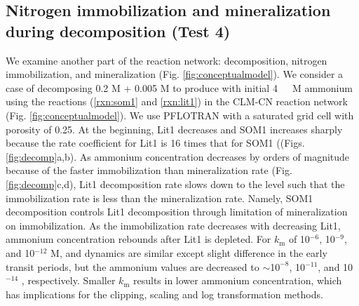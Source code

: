 \documentclass[gmd, manuscript]{copernicus}
\begin{document}
\subsection{Nitrogen immobilization and mineralization during decomposition (Test 4)}
We examine another part of the reaction network: decomposition, nitrogen immobilization, and mineralization (Fig.  \ref{fig:conceptualmodel}). We consider a case of decomposing 0.2 \unit{M}  + 0.005 \unit{M}  to produce  with initial 4 \unit{\mu\,M} ammonium using the reactions (\ref{rxn:som1} and \ref{rxn:lit1}) in the CLM-CN
reaction network (Fig. \ref{fig:conceptualmodel}). We use PFLOTRAN with a saturated grid cell with porosity of 0.25. 
At the beginning, Lit1 decreases and SOM1 increases sharply because the rate coefficient for Lit1 is 16 times that for SOM1 ((Figs. \ref{fig:decomp}a,b). As ammonium concentration decreases by orders of magnitude because of the faster immobilization than mineralization rate (Fig. \ref{fig:decomp}c,d), Lit1 decomposition rate slows down to the level such  that the immobilization rate is less than the mineralization rate. Namely, SOM1 decomposition controls Lit1 decomposition through limitation of mineralization on immobilization. As the immobilization rate decreases with decreasing Lit1, ammonium concentration rebounds after Lit1 is depleted. For $k_\text{m}$ of 10$^{-6}$, 10$^{-9}$, and 10$^{-12}$ M,  and  dynamics are similar except slight difference in the early transit periods, but the ammonium values are decreased to $\sim$1$0^{-8}$, 10$^{-11}$, and 10$^{-14}$ , respectively. Smaller $k_\text{m}$ results in lower ammonium concentration, which has implications for the clipping, scaling and log transformation methods. 
\end{document}

